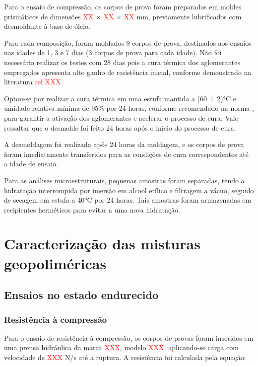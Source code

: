 Para o ensaio de compressão, os corpos de prova foram preparados em moldes prismáticos de dimensões \textcolor{red}{XX} × \textcolor{red}{XX} × \textcolor{red}{XX} mm, previamente lubrificados com desmoldante à base de óleio.


Para cada composição, foram moldados 9 corpos de prova, destinados aos ensaios nas idades de 1, 3 e 7 dias (3 corpos de prova para cada idade). Não foi necessário realizar os testes com 28 dias pois a cura térmica dos aglomerantes empregados apresenta alto ganho de resistência inicial, conforme demonstrado na literatura \textcolor{red}{ref XXX}.

Optou-se por realizar a cura térmica em uma estufa mantida a (60 ± 2)°C e umidade relativa mínima de 95\% por 24 horas, conforme recomendado na norma \cite{ABNT_NBR_9479_2006}, para garantir a ativação dos aglomerantes e acelerar o processo de cura.
Vale ressaltar que o desmolde foi feito 24 horas após o início do processo de cura.

A desmoldagem foi realizada após 24 horas da moldagem, e os corpos de prova foram imediatamente transferidos para as condições de cura correspondentes até a idade de ensaio.

Para as análises microestruturais, pequenas amostras foram separadas, tendo a hidratação interrompida por imersão em alcool etílico e filtragem a vácuo, seguido de secagem em estufa a 40°C por 24 horas. Tais amostras foram armazenadas em recipientes herméticos para evitar a uma nova hidratação.

\section{Caracterização das misturas geopoliméricas}
\label{sec:caracterizacao_das_misturas_geopolimericas}

\subsection{Ensaios no estado endurecido}
\label{subsec:ensaios_no_estado_endurecido}

\subsubsection{Resistência à compressão}
\label{subsubsec:resistencia_a_compressao}

Para o ensaio de resistência à compressão, os corpos de provas foram inseridos em uma prensa hidráulica da marca \textcolor{red}{XXX}, modelo \textcolor{red}{XXX}, aplicando-se carga com velocidade de \textcolor{red}{XXX} N/s até a ruptura. A resistência foi calculada pela equação:

